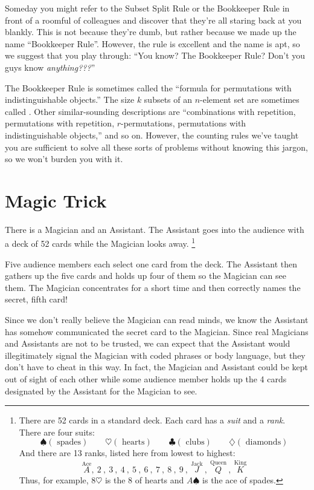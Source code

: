Someday you might refer to the Subset Split Rule or the Bookkeeper Rule
in front of a roomful of colleagues and discover that they're all staring
back at you blankly.  This is not because they're dumb, but rather because
we made up the name ``Bookkeeper Rule''.  However, the rule is excellent
and the name is apt, so we suggest that you play through: ``You know?  The
Bookkeeper Rule?  Don't you guys know \emph{anything???}''

The Bookkeeper Rule is sometimes called the ``formula for permutations
with indistinguishable objects.''  The size $k$ subsets of an $n$-element
set are sometimes called .  Other similar-sounding
descriptions are ``combinations with repetition, permutations with
repetition, $r$-permutations, permutations with indistinguishable
objects,'' and so on.  However, the counting rules we've taught you are
sufficient to solve all these sorts of problems without knowing this
jargon, so we won't burden you with it.

\begin{problems}
\classproblems
{}
\end{problems}


\section{Magic Trick}

There is a Magician and an Assistant.  The Assistant goes into the
audience with a deck of 52 cards while the Magician looks away.%
\footnote{ There are 52 cards in a standard deck.  Each card has a
  \emph{suit} and a \emph{rank}.  There are four suits:
%
\[
\spadesuit (\text{ spades}) \qquad
\heartsuit (\text{ hearts}) \qquad
\clubsuit (\text{ clubs}) \qquad
\diamondsuit (\text{ diamonds})
\]
%
And there are 13 ranks, listed here from lowest to highest:
%
\[
\stackrel{\text{Ace}}{A},\
2\ ,\ 3\ ,\ 4\ ,\ 5\ ,\ 6\ ,\ 7\ ,\ 8\ ,\ 9\ ,\
\stackrel{\text{Jack}}{J}\ ,\
\stackrel{\text{Queen}}{Q}\ ,\
\stackrel{\text{King}}{K}
\]
%
Thus, for example, $8 \heartsuit$ is the 8 of hearts and $A
\spadesuit$ is the ace of spades.}

Five audience members each select one card from the deck.  The Assistant
then gathers up the five cards and holds up four of them so the Magician
can see them.  The Magician concentrates for a short time and then
correctly names the secret, fifth card!

Since we don't really believe the Magician can read minds, we know the
Assistant has somehow communicated the secret card to the Magician.  Since
real Magicians and Assistants are not to be trusted, we can expect that
the Assistant would illegitimately signal the Magician with coded phrases
or body language, but they don't have to cheat in this way.  In fact, the
Magician and Assistant could be kept out of sight of each other while some
audience member holds up the 4 cards designated by the Assistant for the
Magician to see.

